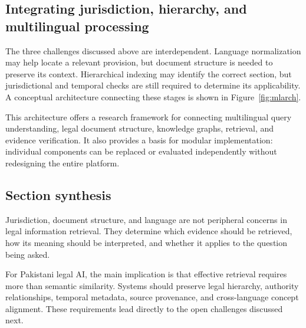 \subsection{Integrating jurisdiction, hierarchy, and multilingual processing}

The three challenges discussed above are interdependent. Language normalization may help locate a
relevant provision, but document structure is needed to preserve its context. Hierarchical indexing may
identify the correct section, but jurisdictional and temporal checks are still required to determine its
applicability. A conceptual architecture connecting these stages is shown in Figure~\ref{fig:mlarch}.



This architecture offers a research framework for connecting multilingual query understanding, legal
document structure, knowledge graphs, retrieval, and evidence verification. It also provides a basis for
modular implementation: individual components can be replaced or evaluated independently without
redesigning the entire platform.

\subsection{Section synthesis}

Jurisdiction, document structure, and language are not peripheral concerns in legal information
retrieval. They determine which evidence should be retrieved, how its meaning should be interpreted, and
whether it applies to the question being asked.

For Pakistani legal AI, the main implication is that effective retrieval requires more than semantic
similarity. Systems should preserve legal hierarchy, authority relationships, temporal metadata, source
provenance, and cross-language concept alignment. These requirements lead directly to the open
challenges discussed next.
